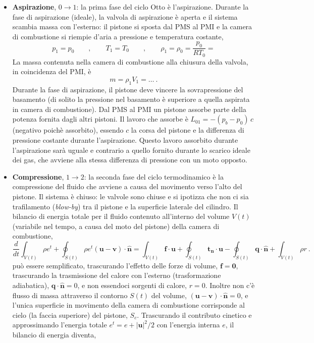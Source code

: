 \begin{itemize}
\item \textbf{Aspirazione}, $0 \rightarrow 1$: la prima fase del ciclo Otto è l'aspirazione. Durante la fase di aspirazione (ideale), la valvola di aspirazione è aperta e il sistema scambia massa con l'esterno: il pistone si sposta dal PMS al PMI e la camera di combustione si riempie d'aria a pressione e temperatura costante,
\begin{equation}
 p_1 = p_0 \qquad , \qquad
 T_1 = T_0 \qquad , \qquad
 \rho_1 = \rho_0 = \dfrac{p_0}{R T_0} =
\end{equation}
La massa contenuta nella camera di combustione alla chiusura della valvola, in coincidenza del PMI, è
\begin{equation}
 m = \rho_1 V_1 = \dots \ .
\end{equation}
Durante la fase di aspirazione, il pistone deve vincere la sovrapressione del basamento (di solito la pressione nel basamento è superiore a quella aspirata in camera di combustione). Dal PMS al PMI un pistone assorbe parte della potenza fornita dagli altri pistoni. Il lavoro che assorbe è $L_{01} = -(p_b-p_0) \, c$ (negativo poichè assorbito), essendo $c$ la corsa del pistone e la differenza di pressione costante durante l'aspirazione. Questo lavoro assorbito durante l'aspirazione sarà uguale e contrario a quello fornito durante lo scarico ideale dei gas,  che avviene alla stessa differenza di pressione con un moto opposto.
\item \textbf{Compressione}, $1 \rightarrow 2$: la seconda fase del ciclo termodinamico è la compressione del fluido che avviene a causa del movimento verso l'alto del pistone. Il sistema è chiuso: le valvole sono chiuse e si ipotizza che non ci sia trafilamento (\textit{blow-by}) tra il pistone e la superficie laterale del cilindro. Il bilancio di energia totale per il fluido contenuto all'interno del volume $V(t)$ (variabile nel tempo, a causa del moto del pistone) della camera di combustione,
\begin{equation}
 \dfrac{d}{dt} \displaystyle\int_{V(t)} \rho e^t + \oint_{S(t)} \rho e^t (\bm{u}-\bm{v}) \cdot \bm{\hat{n}}= \int_{V(t)} \bm{f} \cdot \bm{u} + \oint_{S(t)} \bm{t_n} \cdot \bm{u} - \oint_{S(t)} \bm{q} \cdot \bm{\hat{n}} + \int_{V(t)} \rho r \ .
\end{equation}
può essere semplificato, trascurando l'effetto delle forze di volume, $\bm{f} = \bm{0}$, trascurando la trasmissione del calore con l'esterno (trasformazione adiabatica), $\bm{q} \cdot \bm{\hat{n}} = 0$, e non essendoci sorgenti di calore, $r = 0$. Inoltre non c'è flusso di massa attraverso il contorno $S(t)$ del volume, $(\bm{u}-\bm{v}) \cdot \bm{\hat{n}} = 0$, e l'unica superficie in movimento della camera di combustione corrisponde al cielo (la faccia superiore) del pistone, $S_{c}$. Trascurando il contributo cinetico e approssimando l'energia totale $e^t = e + |\bm{u}|^2/2$ con l'energia interna $e$, il bilancio di energia diventa,

\end{itemize}
